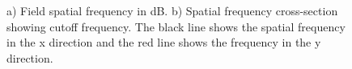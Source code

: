 \documentclass[conference]{IEEEtran}
\begin{document}
\begin{figure}
	\centering
	\caption{a) Field spatial frequency in dB. b) Spatial frequency cross-section showing cutoff frequency. The black line shows the spatial frequency in the x direction and the red line shows the frequency in the y direction.}
\end{figure}

\newpage
\end{document}
